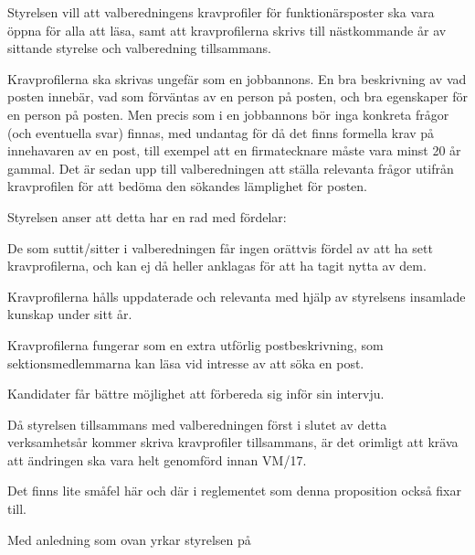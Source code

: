 \documentclass[../_main/handlingar.tex]{subfiles}
\begin{document}

Styrelsen vill att valberedningens kravprofiler för funktionärsposter ska vara öppna för alla att läsa, samt att kravprofilerna skrivs till nästkommande år av sittande styrelse och valberedning tillsammans.

Kravprofilerna ska skrivas ungefär som en jobbannons. En bra beskrivning av vad posten innebär, vad som förväntas av en person på posten, och bra egenskaper för en person på posten. Men precis som i en jobbannons bör inga konkreta frågor (och eventuella svar) finnas, med undantag för då det finns formella krav på innehavaren av en post, till exempel att en firmatecknare måste vara minst 20 år gammal. Det är sedan upp till valberedningen att ställa relevanta frågor utifrån kravprofilen för att bedöma den sökandes lämplighet för posten.

Styrelsen anser att detta har en rad med fördelar:
\begin{dashlist}
    \item De som suttit/sitter i valberedningen får ingen orättvis fördel av att ha sett kravprofilerna, och kan ej då heller anklagas för att ha tagit nytta av dem.
    \item Kravprofilerna hålls uppdaterade och relevanta med hjälp av styrelsens insamlade kunskap under sitt år.
    \item Kravprofilerna fungerar som en extra utförlig postbeskrivning, som sektionsmedlemmarna kan läsa vid intresse av att söka en post.
    \item Kandidater får bättre möjlighet att förbereda sig inför sin intervju.
\end{dashlist}

Då styrelsen tillsammans med valberedningen först i slutet av detta verksamhetsår kommer skriva kravprofiler tillsammans, är det orimligt att kräva att ändringen ska vara helt genomförd innan VM/17.

Det finns lite småfel här och där i reglementet som denna proposition också fixar till.

\newpage

Med anledning som ovan yrkar styrelsen på
\end{document}
